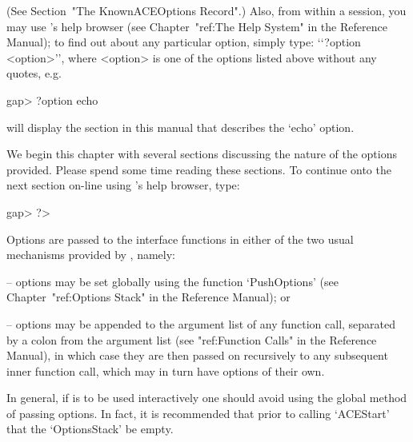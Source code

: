 (See Section~"The KnownACEOptions Record".) Also, from within a {\GAP}
session, you may use {\GAP}'s help browser (see Chapter~"ref:The  Help
System" in the  {\GAP}  Reference  Manual);  to  find  out  about  any
particular {\ACE} option, simply type: \lq{}`?option <option>'', where
<option> is one of the options listed above without any quotes, e.g.

\beginexample
gap> ?option echo
\endexample

will display the section in this  manual  that  describes  the  `echo'
option.

We begin this chapter with several sections discussing the  nature  of
the options provided. Please spend some time reading  these  sections.
To continue onto the next section on-line using {\GAP}'s help browser,
type:

\beginexample
gap> ?>
\endexample


Options are passed to the {\ACE} interface functions in either of the
two usual mechanisms provided by {\GAP}, namely:

\beginlist

\item{--} options may be set globally using the function `PushOptions'
(see Chapter~"ref:Options Stack" in the {\GAP} Reference  Manual); or

\item{--} options may be appended to the argument list of any function
call, separated by a colon from the argument list  (see  "ref:Function
Calls" in the {\GAP} Reference Manual), in which case  they  are  then
passed on recursively to any subsequent inner function call, which may
in turn have options of their own.

\endlist

In general, if {\ACE} is to be used  interactively  one  should  avoid
using the global method of passing options. In fact, it is recommended
that prior to calling `ACEStart' that the `OptionsStack' be empty.


\beginitems

